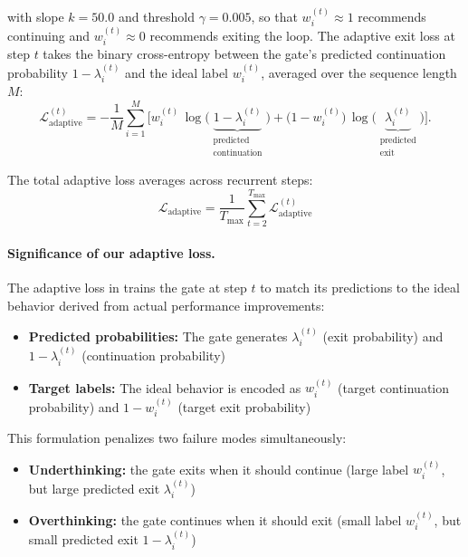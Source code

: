 \documentclass[]{bytedance_seed}
\newcommand{\1}{\mathbf{1}}
\begin{document}
with slope $k=50.0$ and threshold $\gamma=0.005$, so that $w^{(t)}_i\!\approx\!1$ recommends continuing and $w^{(t)}_i\!\approx\!0$ recommends exiting the loop.
The adaptive exit loss at step $t$ takes the binary cross-entropy between the gate's predicted continuation probability $1-\lambda^{(t)}_{i}$ and the ideal label $w^{(t)}_i$, averaged over the sequence length $M$:
\begin{equation}\label{eqdef:adaptive-loss}
\mathcal{L}^{(t)}_{\text{adaptive}}
= - \frac{1}{M}\sum_{i=1}^{M}\!\Big[
w^{(t)}_{i}\,\log\bigl(\underbrace{1-\lambda^{(t)}_{i}}_{\substack{\text{predicted}\\\text{continuation}}}\bigr)
+\bigl(1-w^{(t)}_{i}\bigr)\,\log\bigl(\underbrace{\lambda^{(t)}_{i}}_{\substack{\text{predicted}\\\text{exit}}}\bigr)
\Big].
\end{equation}


The total adaptive loss averages across recurrent steps: 
\begin{equation*}
    \mathcal{L}_{\text{adaptive}} = \frac{1}{T_{\max}} \sum_{t=2}^{T_{\max}} \mathcal{L}_{\text{adaptive}}^{(t)}
\end{equation*}

\paragraph{Significance of our adaptive loss.}
The adaptive loss in  trains the gate at step $t$ to match its predictions to the ideal behavior derived from actual performance improvements:
\begin{itemize}
    \item \textbf{Predicted probabilities:} The gate generates $\lambda^{(t)}_{i}$ (exit probability) and $1-\lambda^{(t)}_{i}$ (continuation probability)
    \item \textbf{Target labels:} The ideal behavior is encoded as $w^{(t)}_{i}$ (target continuation probability) and $1-w^{(t)}_{i}$ (target exit probability)
\end{itemize}

This formulation penalizes two failure modes simultaneously:
\begin{itemize}
    \item \textbf{Underthinking:} the gate exits when it should continue (large label $w^{(t)}_{i}$, but large predicted exit $\lambda^{(t)}_{i}$)
    \item \textbf{Overthinking:} the gate continues when it should exit (small label $w^{(t)}_{i}$, but small predicted exit $1-\lambda^{(t)}_{i}$)
\end{itemize}
\end{document}
